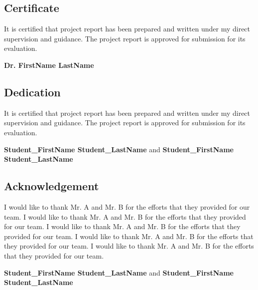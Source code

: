 \documentclass[11pt,a4paper]{report}
\newcommand{\supervisorname}{\textbf{Dr. FirstName LastName}}
\newcommand{\firststudentname}{\textbf{Student\_FirstName Student\_LastName}}
\newcommand{\secondstudentname}{\textbf{Student\_FirstName Student\_LastName}}
\begin{document}

 \vspace*{2cm}

\begin{center}\section*{Certificate}\end{center}
\begin{spacing}{1.5}
It is certified that project report has been prepared and written under my direct supervision and guidance. The project report is approved for submission for its evaluation.
\end{spacing}
\begin{flushright}
  {\supervisorname}
\end{flushright}

\clearpage
 \vspace*{2cm}

\begin{center}\section*{Dedication}\end{center}
\begin{spacing}{1.5}
It is certified that project report has been prepared and written under my direct supervision and guidance. The project report is approved for submission for its evaluation.
\end{spacing}
\begin{flushright}
{\firststudentname} and {\secondstudentname}
\end{flushright}

\clearpage
 \vspace*{2cm}

\begin{center}\section*{Acknowledgement}\end{center}
\begin{spacing}{1.5}
I would like to thank Mr. A and Mr. B for the efforts that they provided for our team. I would like to thank Mr. A and Mr. B for the efforts that they provided for our team. I would like to thank Mr. A and Mr. B for the efforts that they provided for our team. I would like to thank Mr. A and Mr. B for the efforts that they provided for our team. I would like to thank Mr. A and Mr. B for the efforts that they provided for our team. 
\end{spacing}
\begin{flushright}
{\firststudentname} and {\secondstudentname}
\end{flushright}
\end{document}

